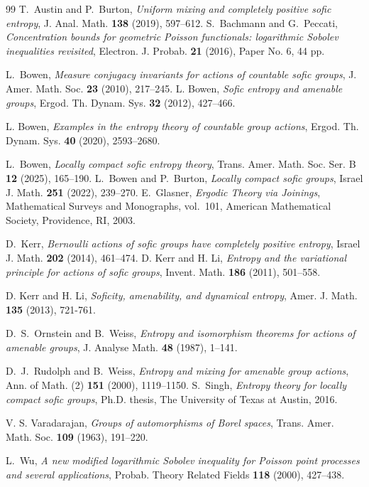 \documentclass[12pt]{amsart}
\theoremstyle{definition}
\newcommand{\1}{\mathbf 1}
\begin{document}
\begin{thebibliography}{99}
	T.~Austin and P.~Burton,
	\emph{Uniform mixing and completely positive sofic entropy},
	J. Anal. Math. \textbf{138} (2019), 597--612.
	S.~Bachmann and G.~Peccati,
	\emph{Concentration bounds for geometric Poisson functionals: logarithmic Sobolev inequalities revisited},
	Electron. J. Probab. \textbf{21} (2016), Paper No. 6, 44 pp.
	
	L.~Bowen,
	\emph{Measure conjugacy invariants for actions of countable sofic groups},
	J. Amer. Math. Soc. \textbf{23} (2010), 217--245.
	L. Bowen,
	\textit{Sofic entropy and amenable groups}, Ergod. Th. Dynam. Sys. \textbf{32} (2012), 427--466.
	
	L. Bowen,
	\textit{Examples in the entropy theory of countable group actions}, Ergod. Th. Dynam. Sys. \textbf{40} (2020), 2593--2680.
	
	L.~Bowen,
	\emph{Locally compact sofic entropy theory},
	Trans. Amer. Math. Soc. Ser. B \textbf{12} (2025), 165--190.
	L.~Bowen and P.~Burton,
	\emph{Locally compact sofic groups},
	Israel J. Math. \textbf{251} (2022), 239--270.
	E.~Glasner,
	\emph{Ergodic Theory via Joinings},
	Mathematical Surveys and Monographs, vol.~101,
	American Mathematical Society, Providence, RI, 2003.

	
	
	
	

	

	
	D.~Kerr,
	\emph{Bernoulli actions of sofic groups have completely positive entropy},
	Israel J. Math. \textbf{202} (2014), 461--474.
	 D. Kerr and H. Li, \textit{Entropy and the variational principle for actions of sofic groups}, Invent. Math. \textbf{186} (2011), 501--558.
	
	 D. Kerr and H. Li, \textit{Soficity, amenability, and dynamical entropy}, Amer. J. Math. \textbf{135} (2013), 721-761.
		
	D.~S.~Ornstein and B.~Weiss,
	\emph{Entropy and isomorphism theorems for actions of amenable groups},
	J. Analyse Math. \textbf{48} (1987), 1--141.
	
	D.~J.~Rudolph and B.~Weiss,
	\emph{Entropy and mixing for amenable group actions},
	Ann. of Math. (2) \textbf{151} (2000), 1119--1150.
	S.~Singh,
	\emph{Entropy theory for locally compact sofic groups},
	Ph.D. thesis, The University of Texas at Austin, 2016.
	
	V. S. Varadarajan, \emph{Groups of automorphisms of Borel spaces}, Trans.
	Amer. Math. Soc. \textbf{109} (1963), 191--220.
	
	L.~Wu,
	\emph{A new modified logarithmic Sobolev inequality for Poisson point processes and several applications},
	Probab. Theory Related Fields \textbf{118} (2000), 427--438.
	
\end{thebibliography}
\end{document}
